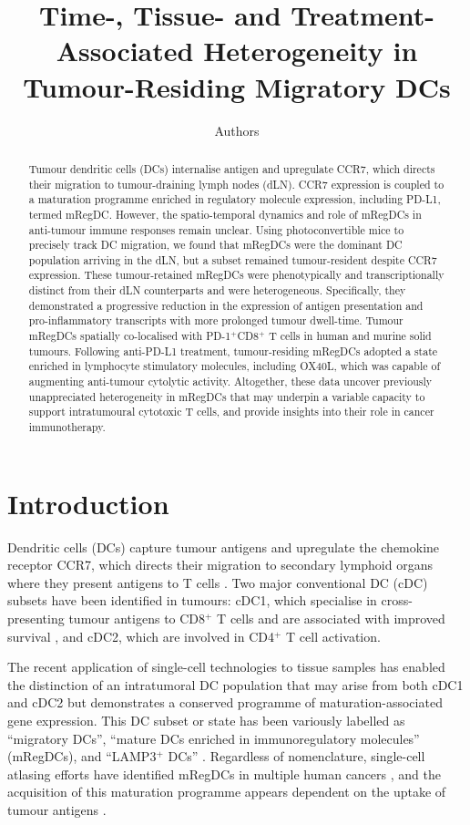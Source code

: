 \documentclass[11pt]{article}
\title{Time-, Tissue- and Treatment-Associated Heterogeneity in Tumour-Residing Migratory DCs}
\author{Authors}
\date{}
\begin{document}
\maketitle

\begin{abstract}
Tumour dendritic cells (DCs) internalise antigen and upregulate CCR7, which directs their migration to tumour-draining lymph nodes (dLN). CCR7 expression is coupled to a maturation programme enriched in regulatory molecule expression, including PD-L1, termed mRegDC. However, the spatio-temporal dynamics and role of mRegDCs in anti-tumour immune responses remain unclear. Using photoconvertible mice to precisely track DC migration, we found that mRegDCs were the dominant DC population arriving in the dLN, but a subset remained tumour-resident despite CCR7 expression. These tumour-retained mRegDCs were phenotypically and transcriptionally distinct from their dLN counterparts and were heterogeneous. Specifically, they demonstrated a progressive reduction in the expression of antigen presentation and pro-inflammatory transcripts with more prolonged tumour dwell-time. Tumour mRegDCs spatially co-localised with PD-1$^+$CD8$^+$ T cells in human and murine solid tumours. Following anti-PD-L1 treatment, tumour-residing mRegDCs adopted a state enriched in lymphocyte stimulatory molecules, including OX40L, which was capable of augmenting anti-tumour cytolytic activity. Altogether, these data uncover previously unappreciated heterogeneity in mRegDCs that may underpin a variable capacity to support intratumoural cytotoxic T cells, and provide insights into their role in cancer immunotherapy.
\end{abstract}

\section{Introduction}

Dendritic cells (DCs) capture tumour antigens and upregulate the chemokine receptor CCR7, which directs their migration to secondary lymphoid organs where they present antigens to T cells \citep{Wculek2019,Roberts2016,Sallusto1998}. Two major conventional DC (cDC) subsets have been identified in tumours: cDC1, which specialise in cross-presenting tumour antigens to CD8$^+$ T cells and are associated with improved survival \citep{Bottcher2018}, and cDC2, which are involved in CD4$^+$ T cell activation.

The recent application of single-cell technologies to tissue samples has enabled the distinction of an intratumoral DC population that may arise from both cDC1 and cDC2 but demonstrates a conserved programme of maturation-associated gene expression. This DC subset or state has been variously labelled as ``migratory DCs'', ``mature DCs enriched in immunoregulatory molecules'' (mRegDCs), and ``LAMP3$^+$ DCs'' \citep{Maier2020,Mulder2021,Zilionis2019}. Regardless of nomenclature, single-cell atlasing efforts have identified mRegDCs in multiple human cancers \citep{Cheng2021,Zhang2019,Maier2020}, and the acquisition of this maturation programme appears dependent on the uptake of tumour antigens \citep{Maier2020}.
\end{document}
